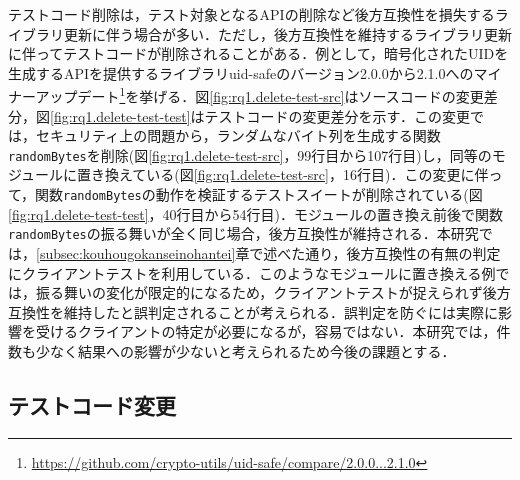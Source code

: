 \documentclass[11pt,dvipdfmx]{jreport}
\begin{document}
テストコード削除は，テスト対象となるAPIの削除など後方互換性を損失するライブラリ更新に伴う場合が多い．ただし，後方互換性を維持するライブラリ更新に伴ってテストコードが削除されることがある．例として，暗号化されたUIDを生成するAPIを提供するライブラリuid-safeのバージョン2.0.0から2.1.0へのマイナーアップデート\footnote{\url{https://github.com/crypto-utils/uid-safe/compare/2.0.0...2.1.0}}を挙げる．図\ref{fig:rq1.delete-test-src}はソースコードの変更差分，図\ref{fig:rq1.delete-test-test}はテストコードの変更差分を示す．この変更では，セキュリティ上の問題から，ランダムなバイト列を生成する関数{\verb|randomBytes|}を削除(図\ref{fig:rq1.delete-test-src}，99行目から107行目)し，同等のモジュールに置き換えている(図\ref{fig:rq1.delete-test-src}，16行目)．この変更に伴って，関数{\verb|randomBytes|}の動作を検証するテストスイートが削除されている(図\ref{fig:rq1.delete-test-test}，40行目から54行目)．モジュールの置き換え前後で関数{\verb|randomBytes|}の振る舞いが全く同じ場合，後方互換性が維持される．本研究では，\ref{subsec:kouhougokanseinohantei}章で述べた通り，後方互換性の有無の判定にクライアントテストを利用している．このようなモジュールに置き換える例では，振る舞いの変化が限定的になるため，クライアントテストが捉えられず後方互換性を維持したと誤判定されることが考えられる．誤判定を防ぐには実際に影響を受けるクライアントの特定が必要になるが，容易ではない\cite{detecting-locations-in-js}．本研究では，件数も少なく結果への影響が少ないと考えられるため今後の課題とする．

\subsection{テストコード変更}\label{subsec:change-test}
\end{document}
